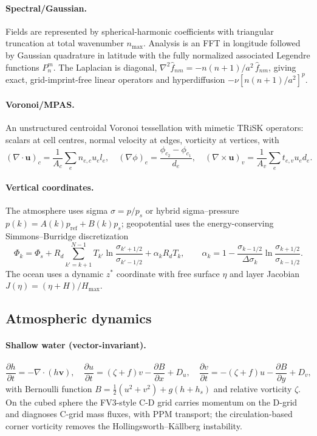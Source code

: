 \documentclass[11pt]{article}
\newcommand{\pp}{\partial}
\newcommand{\half}{\tfrac{1}{2}}
\newcommand{\Rd}{R_d}
\newcommand{\vect}[1]{\bm{#1}}
\newcommand{\grad}{\nabla}
\newcommand{\divg}{\nabla\!\cdot\!}
\newcommand{\curl}{\nabla\!\times\!}
\begin{document}
\paragraph{Spectral/Gaussian.} Fields are represented by spherical-harmonic coefficients with
triangular truncation at total wavenumber $n_{\max}$\cite{Bourke1972}. Analysis is an FFT in
longitude followed by Gaussian quadrature in latitude with the fully normalized associated
Legendre functions $P_n^m$. The Laplacian is diagonal, $\nabla^2\hat f_{nm}=-n(n+1)/a^2\,\hat
f_{nm}$, giving exact, grid-imprint-free linear operators and hyperdiffusion
$-\nu[n(n+1)/a^2]^p$.

\paragraph{Voronoi/MPAS.} An unstructured centroidal Voronoi tessellation with mimetic TRiSK
operators\cite{Thuburn2009,Ringler2010,Skamarock2012}: scalars at cell centres, normal velocity
at edges, vorticity at vertices, with
\begin{equation}
(\divg\vect{u})_c=\frac{1}{A_c}\sum_e n_{e,c}u_e l_e,\quad
(\grad\phi)_e=\frac{\phi_{c_2}-\phi_{c_1}}{d_e},\quad
(\curl\vect{u})_v=\frac{1}{A_v}\sum_e t_{e,v}u_e d_e .
\end{equation}

\paragraph{Vertical coordinates.} The atmosphere uses sigma $\sigma=p/p_s$ or hybrid
sigma--pressure $p(k)=A(k)p_{\mathrm{ref}}+B(k)p_s$; geopotential uses the energy-conserving
Simmons--Burridge discretization\cite{SimmonsBurridge1981}
\begin{equation}
\Phi_k=\Phi_s+\Rd\!\!\sum_{k'=k+1}^{N-1}\!T_{k'}\ln\frac{\sigma_{k'+1/2}}{\sigma_{k'-1/2}}
+\alpha_k\Rd T_k,\qquad
\alpha_k=1-\frac{\sigma_{k-1/2}}{\Delta\sigma_k}\ln\frac{\sigma_{k+1/2}}{\sigma_{k-1/2}} .
\end{equation}
The ocean uses a dynamic $z^\ast$ coordinate with free surface $\eta$ and layer Jacobian
$J(\eta)=(\eta+H)/H_{\max}$.

\subsection{Atmospheric dynamics}
\paragraph{Shallow water (vector-invariant).}
\begin{equation}
\frac{\pp h}{\pp t}=-\divg(h\vect{v}),\quad
\frac{\pp u}{\pp t}=(\zeta+f)v-\frac{\pp B}{\pp x}+D_u,\quad
\frac{\pp v}{\pp t}=-(\zeta+f)u-\frac{\pp B}{\pp y}+D_v,
\end{equation}
with Bernoulli function $B=\half(u^2+v^2)+g(h+h_s)$ and relative vorticity $\zeta$. On the
cubed sphere the FV3-style C-D grid carries momentum on the D-grid and diagnoses C-grid mass
fluxes, with PPM transport\cite{ColellaWoodward1984,Lin2004,PutmanLin2007}; the
circulation-based corner vorticity removes the Hollingsworth--K\"allberg instability.
\end{document}

